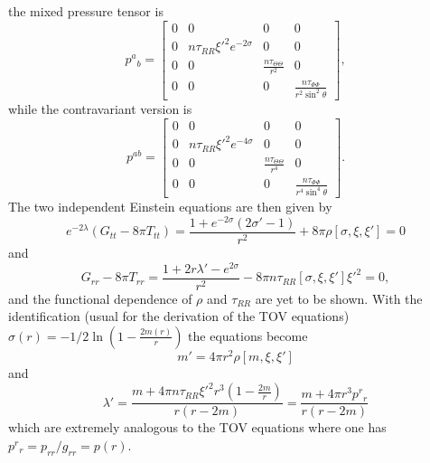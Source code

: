 the mixed pressure tensor is
\begin{equation}
p^a{}_b = \left[
  \begin{array}{cccc}
    0 & 0 & 0 & 0 \\
    0 & n\tau_{RR}\xi'^2e^{-2\sigma} & 0 & 0 \\
    0 & 0 & \frac{n\tau_{\Theta\Theta}}{r^2} & 0 \\
    0 & 0 & 0 & \frac{n\tau_{\Phi\Phi} }{r^2\sin^2\theta}  \end{array}
\right],
\end{equation}
while the contravariant version is
\begin{equation}
p^{ab} = \left[
  \begin{array}{cccc}
    0 & 0 & 0 & 0 \\
    0 & n\tau_{RR}\xi'^2 e^{-4\sigma}& 0 & 0 \\
    0 & 0 & \frac{n\tau_{\Theta\Theta}}{r^4} & 0 \\
    0 & 0 & 0 & \frac{n\tau_{\Phi\Phi} }{r^4\sin^4\theta}
  \end{array}
\right].
\end{equation}
The two independent Einstein equations are then given by
\begin{equation}
e^{-2\lambda}\left(G_{tt} - 8\pi T_{tt}\right) =
\frac{1+e^{-2\sigma}\left(2\sigma' - 1\right)}{r^2} +
8\pi\rho[\sigma,\xi,\xi']
= 0
\end{equation}
and
\begin{equation}
G_{rr} - 8\pi T_{rr} = \frac{1 + 2r\lambda' - e^{2\sigma}}{r^2} -
8\pi n\tau_{RR}[\sigma,\xi,\xi']\xi'^2 = 0,
\end{equation}
and the functional dependence of $\rho$ and $\tau_{RR}$ are yet to be
shown. With the identification (usual for the derivation of the TOV equations)
$\sigma(r) = -1/2\ln{\left(1-\frac{2m(r)}{r}\right)}$ the equations
become
\begin{equation}
m' = 4\pi r^2\rho[m,\xi,\xi']
\end{equation}
and
\begin{equation}
\lambda' = \frac{m + 4\pi n\tau_{RR}\xi'^2r^3 (1-\frac{2m}{r})}{r(r-2m)}
= \frac{m + 4\pi r^3 p^r{}_r}{r(r-2m)}
\end{equation}
which are extremely analogous to the TOV equations where one has $p^r{}_r
 = p_{rr}/g_{rr} = p(r)$.

